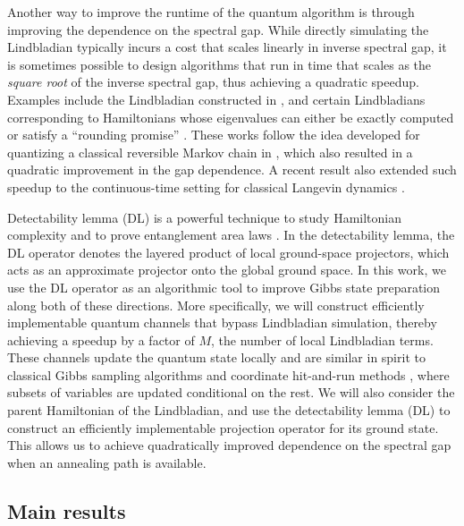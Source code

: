 \documentclass{article}
\theoremstyle{plain}
\theoremstyle{plain}
\theoremstyle{plain}
\theoremstyle{plain}
\theoremstyle{plain}
\theoremstyle{plain}
\theoremstyle{plain}
\begin{document}
Another way to improve the runtime of the quantum algorithm is through improving the dependence on the spectral gap. While directly simulating the Lindbladian typically incurs a cost that scales linearly in inverse spectral gap, it is sometimes possible to design algorithms that run in time that scales as the \textit{square root} of the inverse spectral gap, thus achieving a quadratic speedup. Examples include the Lindbladian constructed in \cite{chen2023quantumthermalstatepreparation}, and certain Lindbladians corresponding to Hamiltonians whose eigenvalues can either be exactly computed or satisfy a ``rounding promise'' \cite{WocjanTemme2023}. These works follow the idea developed for quantizing a classical reversible Markov chain in \cite{szegedy2004quantum}, which also resulted in a quadratic improvement in the gap dependence. A recent result also extended such speedup to the continuous-time setting for classical Langevin dynamics \cite{LengDingChenLin2026operator}.

Detectability lemma (DL) is a powerful technique to study Hamiltonian complexity and to prove entanglement area laws \cite{AharonovAradVaziraniLandau2011detectability,AradKitaevLandauVazirani2013area,AharonovAradLandauVazirani2009}.
In the detectability lemma, the DL operator denotes the layered product of local ground-space projectors, which acts as an approximate projector onto the global ground space.
In this work, we use the DL operator as an algorithmic tool to improve Gibbs state preparation along both of these directions. More specifically, we will construct efficiently implementable quantum channels that bypass Lindbladian simulation,
thereby achieving a speedup by a factor of $M$, the number of local Lindbladian terms. These channels update the quantum state locally and are similar in spirit to classical Gibbs sampling algorithms \cite{ascolani2024entropy, liu1995covariance} and coordinate hit-and-run methods \cite{narayanan2022mixing}, where subsets of variables are updated conditional on the rest.
We will also consider the parent Hamiltonian of the Lindbladian, and use the detectability lemma (DL)
to construct an efficiently implementable projection operator for its ground state. This allows us to achieve quadratically improved dependence on the spectral gap when an annealing path is available. 

\subsection{Main results}
\end{document}
